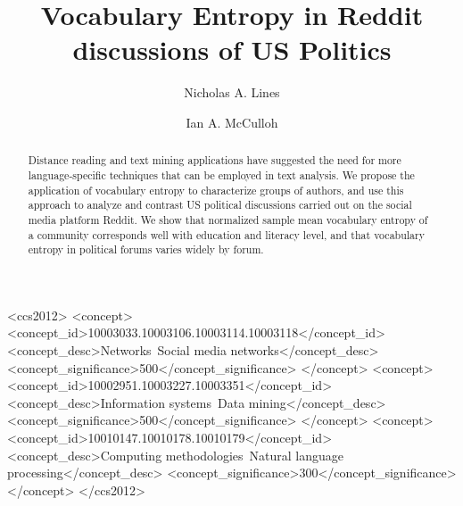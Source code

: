 \documentclass[sigconf]{acmart}
\begin{document}
\title{Vocabulary Entropy in Reddit discussions of US Politics}

\author{Nicholas A. Lines}
\author{Ian A. McCulloh}
\authornotemark[1]

\renewcommand{\shortauthors}{Lines and McCulloh}

\begin{abstract}
  Distance reading and text mining applications have suggested the need for more language-specific techniques
  that can be employed in text analysis. We propose the application of vocabulary entropy to characterize groups of authors,
  and use this approach to analyze and contrast US political discussions carried out on the social media platform
  Reddit. We show that normalized sample mean vocabulary entropy of a community corresponds well with education and literacy
  level, and that vocabulary entropy in political forums varies widely by forum.
\end{abstract}

\begin{CCSXML}
<ccs2012>
   <concept>
       <concept_id>10003033.10003106.10003114.10003118</concept_id>
       <concept_desc>Networks~Social media networks</concept_desc>
       <concept_significance>500</concept_significance>
       </concept>
   <concept>
       <concept_id>10002951.10003227.10003351</concept_id>
       <concept_desc>Information systems~Data mining</concept_desc>
       <concept_significance>500</concept_significance>
       </concept>
   <concept>
       <concept_id>10010147.10010178.10010179</concept_id>
       <concept_desc>Computing methodologies~Natural language processing</concept_desc>
       <concept_significance>300</concept_significance>
       </concept>
 </ccs2012>
\end{CCSXML}
\end{document}
